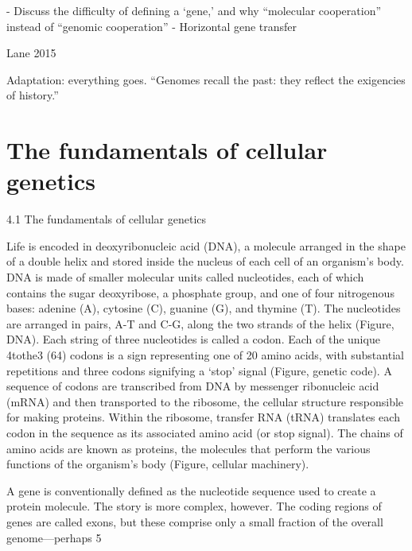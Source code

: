 \documentclass{tufte-book} %
\begin{document}
- Discuss the difficulty of defining a ‘gene,’ and why “molecular cooperation” instead of “genomic cooperation”
- Horizontal gene transfer


Lane 2015

Adaptation: everything goes. “Genomes recall the past: they reflect the exigencies of history.”


\section{The fundamentals of cellular genetics}\label{cell-genetics}

4.1	 The fundamentals of cellular genetics

Life is encoded in deoxyribonucleic acid (DNA), a molecule arranged in the shape of a double helix and stored inside the nucleus of each cell of an organism’s body. DNA is made of smaller molecular units called nucleotides, each of which contains the sugar deoxyribose, a phosphate group, and one of four nitrogenous bases: adenine (A), cytosine (C), guanine (G), and thymine (T). The nucleotides are arranged in pairs, A-T and C-G, along the two strands of the helix (Figure, DNA). Each string of three nucleotides is called a codon. Each of the unique 4tothe3 (64) codons is a sign representing one of 20 amino acids, with substantial repetitions and three codons signifying a ‘stop’ signal (Figure, genetic code). A sequence of codons are transcribed from DNA by messenger ribonucleic acid (mRNA) and then transported to the ribosome, the cellular structure responsible for making proteins. Within the ribosome, transfer RNA (tRNA) translates each codon in the sequence as its associated amino acid (or stop signal). The chains of amino acids are known as proteins, the molecules that perform the various functions of the organism’s body (Figure, cellular machinery). 

A gene is conventionally defined as the nucleotide sequence used to create a protein molecule. The story is more complex, however. The coding regions of genes are called exons, but these comprise only a small fraction of the overall genome—perhaps 5%
\end{document}

